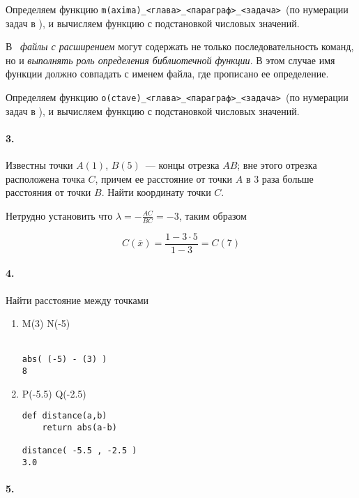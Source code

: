 
Определяем функцию \verb|m(axima)_<глава>_<параграф>_<задача>|\ (по нумерации
задач в \cite{danko}), и вычисляем функцию с подстановкой числовых значений.


В \octave\ \emph{файлы с расширением } могут содержать не только
последовательность команд, но и \emph{выполнять роль определения библиотечной
функции}. В этом случае имя функции должно совпадать с именем файла, где
прописано ее определение.



Определяем функцию \verb|o(ctave)_<глава>_<параграф>_<задача>|\ (по нумерации
задач в \cite{danko}), и вычисляем функцию с подстановкой числовых значений.


\paragraph{3.} Известны точки $A(1)$, $B(5)$\ --- концы отрезка $AB$; вне этого
отрезка расположена точка $C$, причем ее расстояние от точки $A$ в 3 раза больше
расстояния от точки $B$. Найти координату точки $C$.

Нетрудно установить что $\lambda = -\frac{AC}{BC} = -3$, таким образом

\begin{equation}
C(\bar x) = \frac{1-3 \cdot 5}{1-3} = C(7) 
\end{equation}


\paragraph{4.} Найти расстояние между точками

\begin{enumerate}
  \item M(3) N(-5)
   
  \py\\\verb|abs( (-5) - (3) )|\\\verb|8|
  \item P(-5.5) Q(-2.5)
  
  \py
  \begin{verbatim}
def distance(a,b)
    return abs(a-b)

distance( -5.5 , -2.5 )
3.0
\end{verbatim}
\end{enumerate}

\paragraph{5.}

\secup



\secup